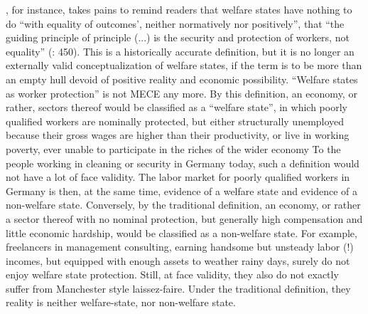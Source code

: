 \documentclass[11pt,a4paper,oneside,openright]{article}
\begin{document}
\begin{enumerate}
	\citeauthor{Offe2003}, for instance, takes pains to remind readers that welfare states have nothing to do ``with equality of outcomes', neither normatively nor positively'', that ``the guiding principle of principle (...) is the security and protection of workers, not equality'' (\citeyear{Offe2003}: 450). 
	This is a historically accurate definition, but it is no longer an externally valid conceptualization of welfare states, if the term is to be more than an empty hull devoid of positive reality and economic possibility. 
	``Welfare states as worker protection'' is not \gls{MECE} any more. 
	By this definition, an economy, or rather, sectors thereof would be classified as a ``welfare state'', in which poorly qualified workers are nominally protected, but either structurally unemployed because their gross wages are higher than their productivity, or live in working poverty, ever unable to participate in the riches of the wider economy
	To the people working in cleaning or security in Germany today, such a definition would not have a lot of face validity. 
	The labor market for poorly qualified workers in Germany is then, at the same time, evidence of a welfare state and evidence of a non-welfare state. 
	Conversely, by the traditional definition, an economy, or rather a sector thereof with no nominal protection, but generally high compensation and little economic hardship, would be classified as a non-welfare state. 
	For example, freelancers in management consulting, earning handsome but unsteady labor (!) incomes, but equipped with enough assets to weather rainy days, surely do not enjoy welfare state protection. 
	Still, at face validity, they also do not exactly suffer from Manchester style laissez-faire. 
	Under the traditional definition, they reality is neither welfare-state, nor non-welfare state.
	

\end{enumerate}
\end{document}
